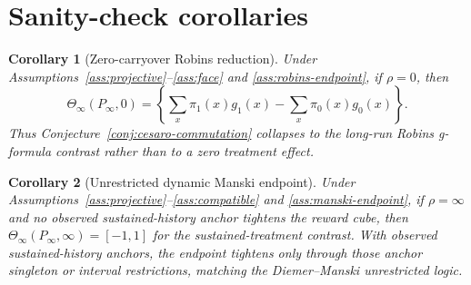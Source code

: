 \documentclass[11pt]{article}
\theoremstyle{definition}
\theoremstyle{plain}
\newtheorem{corollary}{Corollary}
\theoremstyle{remark}
\begin{document}
\section{Sanity-check corollaries}
\begin{corollary}[Zero-carryover Robins reduction]\label{cor:robins}
Under Assumptions~\ref{ass:projective}--\ref{ass:face} and \ref{ass:robins-endpoint}, if \(\rho=0\), then
\[
\Theta_{\infty}(P_{\infty},0)
=\left\{\sum_x\pi_1(x)g_1(x)-\sum_x\pi_0(x)g_0(x)\right\}.
\]
Thus Conjecture~\ref{conj:cesaro-commutation} collapses to the long-run Robins g-formula contrast rather than to a zero treatment effect.
\end{corollary}

\begin{corollary}[Unrestricted dynamic Manski endpoint]\label{cor:manski}
Under Assumptions~\ref{ass:projective}--\ref{ass:compatible} and \ref{ass:manski-endpoint}, if \(\rho=\infty\) and no observed sustained-history anchor tightens the reward cube, then \(\Theta_{\infty}(P_{\infty},\infty)=[-1,1]\) for the sustained-treatment contrast.  With observed sustained-history anchors, the endpoint tightens only through those anchor singleton or interval restrictions, matching the Diemer--Manski unrestricted logic.
\end{corollary}
\end{document}
